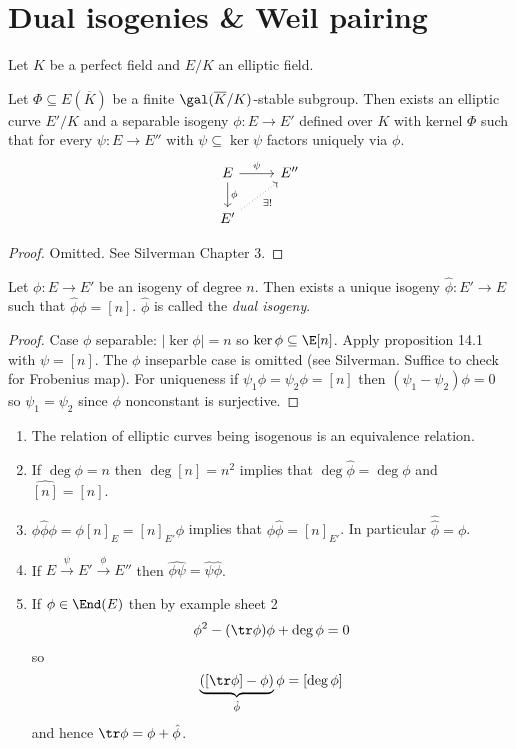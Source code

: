 \documentclass[a4paper]{article}
\theoremstyle{definition}
\theoremstyle{theorem}
\begin{document}
\section{Dual isogenies \& Weil pairing}

Let \(K\) be a perfect field and \(E/K\) an elliptic field.

\begin{proposition}
  Let \(\Phi \subseteq E(\overline K)\) be a finite \(\gal(\overline K/K)\)-stable subgroup. Then exists an elliptic curve \(E'/K\) and a separable isogeny \(\phi: E \to E'\) defined over \(K\) with kernel \(\Phi\) such that for every \(\psi: E \to E''\) with \(\psi \subseteq \ker \psi\) factors uniquely via \(\phi\).
  \[
    \begin{tikzcd}
      E \ar[d, "\phi"] \ar[r, "\psi"] & E'' \\
      E' \ar[ur, dotted, "\exists !"']
    \end{tikzcd}
  \]
\end{proposition}

\begin{proof}
  Omitted. See Silverman Chapter 3.
\end{proof}

\begin{proposition}
  Let \(\phi: E \to E'\) be an isogeny of degree \(n\). Then exists a unique isogeny \(\hat \phi: E' \to E\) such that \(\hat \phi \phi = [n]\). \(\hat \phi\) is called the \emph{dual isogeny}.
\end{proposition}

\begin{proof}
  Case \(\phi\) separable: \(|\ker \phi| = n\) so \(\ker \phi \subseteq \E[n]\). Apply proposition 14.1 with \(\psi = [n]\). The \(\phi\) inseparble case is omitted (see Silverman. Suffice to check for Frobenius map). For uniqueness if \(\psi_1 \phi = \psi_2 \phi = [n]\) then \((\psi_1 - \psi_2) \phi = 0\) so \(\psi_1 = \psi_2\) since \(\phi\) nonconstant is surjective.
\end{proof}

\begin{remark}\leavevmode
  \begin{enumerate}
  \item The relation of elliptic curves being isogenous is an equivalence relation.
  \item If \(\deg \phi = n\) then \(\deg [n] = n^2\) implies that \(\deg \hat \phi = \deg \phi\) and \(\widehat{[n]} = [n]\).
  \item \(\phi \hat \phi \phi = \phi [n]_E = [n]_{E'} \phi\) implies that \(\phi \hat \phi = [n]_{E'}\). In particular \(\hat{\hat \phi} = \phi\).
  \item If \(E \xrightarrow{\psi} E' \xrightarrow{\phi} E''\) then \(\widehat{\phi\psi} = \hat \psi \hat \phi\).
  \item If \(\phi \in \End(E)\) then by example sheet 2
    \[
      \phi^2 - (\tr \phi) \phi + \deg \phi = 0
    \]
    so
    \[
      \underbrace{([\tr \phi] - \phi)}_{\hat \phi} \phi = [\deg \phi]
    \]
    and hence \(\tr \phi = \phi + \hat \phi\).
  \end{enumerate}
\end{remark}
\end{document}
